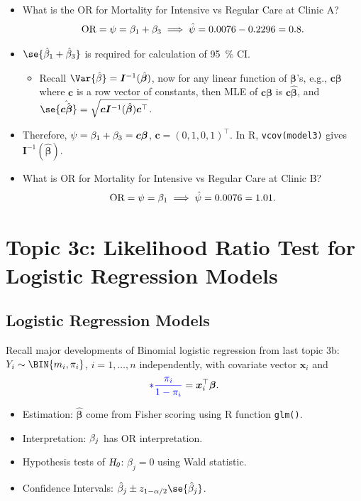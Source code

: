 \documentclass{article}\usepackage[]{graphicx}\usepackage[svgnames]{xcolor}
\let\exp\relax%
\let\log\relax%
\newcommand{\HN}{\textsl{H}_{\textsl{0}}}%
\newcommand{\OR}{\text{OR}}%
\providecommand{\Vector}[1]{\bm{#1}}%
\providecommand{\Matrix}[1]{\bm{#1}}
\begin{document}
\begin{itemize}
      \item What is the OR for Mortality for Intensive vs Regular Care at Clinic A?
            \[ \OR=\psi=\exp{\beta_1+\beta_3}\implies \hat{\psi}=\exp{0.0076-0.2296}=0.8. \]
      \item $ \se{\hat{\beta}_1+\hat{\beta}_3} $ is required for calculation of \qty{95}{\percent} CI.
            \begin{itemize}
                  \item Recall $ \Var{\hat{\beta}}=\Matrix{I}^{-1}(\hat{\Vector{\beta}}) $, now for any linear function of $ \Vector{\beta} $'s,
                        e.g., $ \Vector{c}\Vector{\beta} $ where $ \Vector{c} $ is a row vector of constants, then MLE of $ \Vector{c}\Vector{\beta} $
                        is $ \Vector{c}\hat{\Vector{\beta}} $, and $ \se{\hat{\Vector{c}\hat{\Vector{\beta}}}}=\sqrt{\Vector{c}\Matrix{I}^{-1}(\hat{\Vector{\beta}})\Vector{c}^\top} $.
            \end{itemize}
      \item Therefore, $ \log{\psi}=\beta_1+\beta_3=\Vector{c}\Vector{\beta} $, $ \Vector{c}=(0,1,0,1)^\top $. In R, \texttt{vcov(model3)}
            gives $ \Matrix{I}^{-1}(\hat{\Vector{\beta}}) $.
      \item What is OR for Mortality for Intensive vs Regular Care at Clinic B?
            \[ \OR=\psi=\exp{\beta_1}\implies \hat{\psi}=\exp{0.0076}=1.01. \]
\end{itemize}

\section*{Topic 3c: Likelihood Ratio Test for Logistic Regression Models}
\subsection*{Logistic Regression Models}
Recall major developments of Binomial logistic regression from last topic 3b: $ Y_i \sim \BIN{m_i,\pi_i} $,
$ i=1,\ldots,n $ independently, with covariate vector $ \Vector{x}_i $ and
\[ \textcolor{Blue}{\log*{\frac{\pi_i}{1-\pi_i}}}=\Vector{x}_i^\top \Vector{\beta}. \]
\begin{itemize}
      \item Estimation: $ \hat{\Vector{\beta}} $ come from Fisher scoring using R function \texttt{glm()}.
      \item Interpretation: $ \exp{\beta_j} $ has $ \OR $ interpretation.
      \item Hypothesis tests of $ \HN $: $ \beta_j=0 $ using Wald statistic.
      \item Confidence Intervals: $ \hat{\beta}_j\pm z_{1-\alpha/2}\se{\hat{\beta}_j} $.
\end{itemize}
\end{document}
